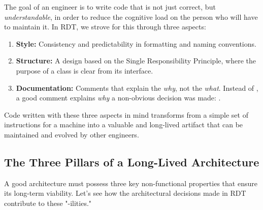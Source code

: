 The goal of an engineer is to write code that is not just correct, but \textit{understandable}, in order to reduce the cognitive load on the person who will have to maintain it. In RDT, we strove for this through three aspects:
\begin{enumerate}
    \item \textbf{Style:} Consistency and predictability in formatting and naming conventions.
    \item \textbf{Structure:} A design based on the Single Responsibility Principle, where the purpose of a class is clear from its interface.
    \item \textbf{Documentation:} Comments that explain the \textit{why}, not the \textit{what}. Instead of , a good comment explains \textit{why} a non-obvious decision was made: .
\end{enumerate}
Code written with these three aspects in mind transforms from a simple set of instructions for a machine into a valuable and long-lived artifact that can be maintained and evolved by other engineers.

\subsection{The Three Pillars of a Long-Lived Architecture}
\label{subsec:three_pillars_longevity}

A good architecture must possess three key non-functional properties that ensure its long-term viability. Let's see how the architectural decisions made in RDT contribute to these "-ilities."

